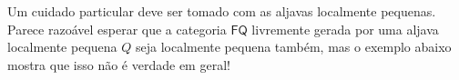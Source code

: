 \begin{obs}
    Um cuidado particular deve ser tomado com as aljavas localmente pequenas.
    Parece razoável esperar que a categoria $\mathsf{FQ}$ livremente gerada por uma aljava localmente pequena $Q$ seja localmente pequena também, mas o exemplo abaixo mostra que isso não é verdade em geral!
\end{obs}

